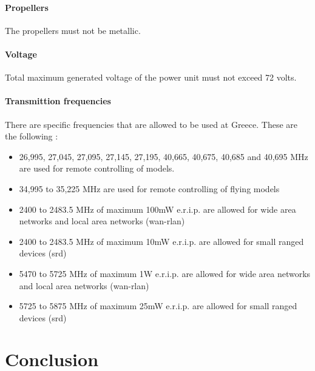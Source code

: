\documentclass[a4paper, 12pt, twoside]{article}
\begin{document}
		\paragraph{Propellers}{The propellers must not be metallic.
		}
		
		\paragraph{Voltage}{Total maximum generated voltage of the power unit must not exceed 72 volts.
		}
		
		\paragraph{Transmittion frequencies}{There are specific frequencies that are allowed to be used at Greece. These are the following :
		\begin{itemize}
			\item 26,995, 27,045, 27,095, 27,145, 27,195, 40,665, 40,675, 40,685 and 40,695 MHz are used for remote controlling of models.
			\item 34,995 to 35,225 MHz are used for remote controlling of flying models
			\item 2400 to 2483.5 MHz of maximum 100mW e.r.i.p. are allowed for wide area networks and local area networks (wan-rlan)
			\item 2400 to 2483.5 MHz of maximum 10mW e.r.i.p. are allowed for small ranged devices (srd)
			\item 5470 to 5725 MHz of maximum 1W e.r.i.p. are allowed for wide area networks and local area networks (wan-rlan)
			\item 5725 to 5875 MHz of maximum 25mW e.r.i.p. are allowed for small ranged devices (srd)
		\end{itemize}
		}
		
		
	\section{Conclusion}
\end{document}
